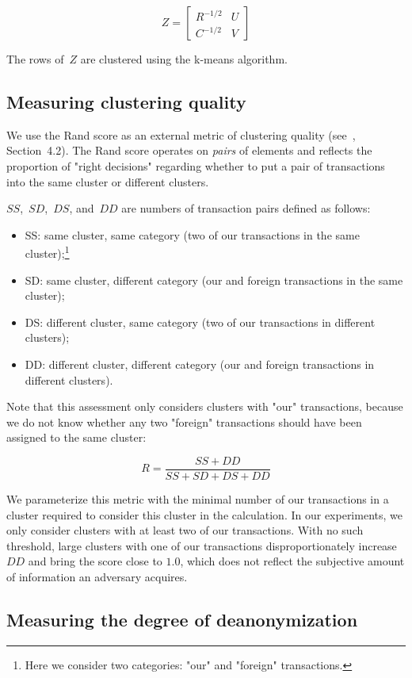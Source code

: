 \[
Z = 
\begin{bmatrix}
R^{-1/2} & U \\
C^{-1/2} & V
\end{bmatrix}
\]

The rows of~$Z$ are clustered using the k-means algorithm.


\subsection{Measuring clustering quality}

We use the Rand score as an external metric of clustering quality (see~\cite{Amigo2009}, Section~4.2).
The Rand score operates on \textit{pairs} of elements and reflects the proportion of "right decisions" regarding whether to put a pair of transactions into the same cluster or different clusters.

$SS$,~$SD$,~$DS$, and~$DD$ are numbers of transaction pairs defined as follows:
\begin{itemize}
	\item SS: same cluster, same category (two of our transactions in the same cluster);\footnote{Here we consider two categories: "our" and "foreign" transactions.}
	\item SD: same cluster, different category (our and foreign transactions in the same cluster);
	\item DS: different cluster, same category (two of our transactions in different clusters);
	\item DD: different cluster, different category (our and foreign transactions in different clusters).
\end{itemize}

Note that this assessment only considers clusters with "our" transactions, because we do not know whether any two "foreign" transactions should have been assigned to the same cluster:

\[
R = \frac{SS + DD}{SS + SD + DS + DD}
\]

We parameterize this metric with the minimal number of our transactions in a cluster required to consider this cluster in the calculation.
In our experiments, we only consider clusters with at least two of our transactions.
With no such threshold, large clusters with one of our transactions disproportionately increase $DD$ and bring the score close to $1.0$, which does not reflect the subjective amount of information an adversary acquires.

\subsection{Measuring the degree of deanonymization}

